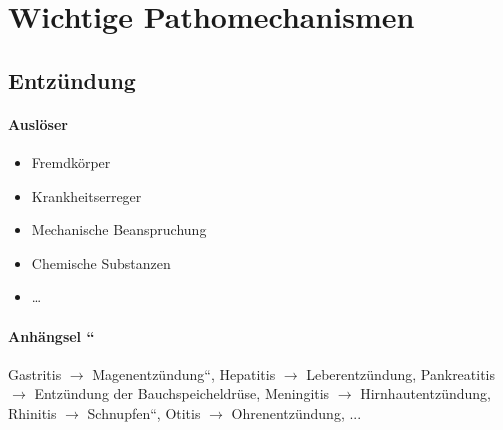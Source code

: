 \section{Wichtige Pathomechanismen}

\subsection{Entzündung}
\label{topic:entzuendung}



\paragraph{Auslöser}

\begin{itemize}
    \item Fremdkörper
    \item Krankheitserreger
    \item Mechanische Beanspruchung
    \item Chemische Substanzen
    \item \ldots{}
\end{itemize}

\paragraph{Anhängsel
{\textquotedblleft{}}}
Gastritis ${\rightarrow}$
{\quotedblbase}Magenentzündung{\textquotedblleft}, Hepatitis
${\rightarrow}$ Leberentzündung, Pankreatitis ${\rightarrow}$
Entzündung der Bauchspeicheldrüse, Meningitis ${\rightarrow}$
Hirnhautentzündung, Rhinitis ${\rightarrow}$
{\quotedblbase}Schnupfen{\textquotedblleft}, Otitis ${\rightarrow}$
Ohrenentzündung, ...


